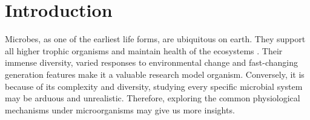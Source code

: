 \documentclass[a4paper]{article}
\begin{document}
\section{Introduction}

Microbes, as one of the earliest life forms, are ubiquitous on earth. They support all higher trophic organisms and maintain health of the ecosystems \citep{whitman1998prokaryotes}. Their immense diversity, varied responses to environmental change and fast-changing generation features make it a valuable research model organism. Conversely, it is because of its complexity and diversity, studying every specific microbial system may be arduous and unrealistic. Therefore, exploring the common physiological mechanisms under microorganisms may give us more insights.\\
\end{document}

